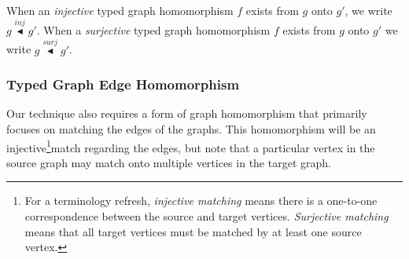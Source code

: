  When an \emph{injective} typed graph homomorphism $f$ exists from $g$ onto $g'$, we write $g \stackrel{inj}{\blacktriangleleft} g'$. When a \emph{surjective} typed graph homomorphism $f$ exists from $g$ onto $g'$ we write $g \stackrel{surj}{\blacktriangleleft} g'$.

\subsubsection*{Typed Graph Edge Homomorphism}

Our technique also requires a form of graph homomorphism that primarily focuses on matching the edges of the graphs. This homomorphism will be an injective\footnote{For a terminology refresh, \textit{injective matching} means there is a one-to-one correspondence between the source and target vertices. \textit{Surjective matching} means that all target vertices must be matched by at least one source vertex. }match regarding the edges, but note that a particular vertex in the source graph may match onto multiple vertices in the target graph. 


